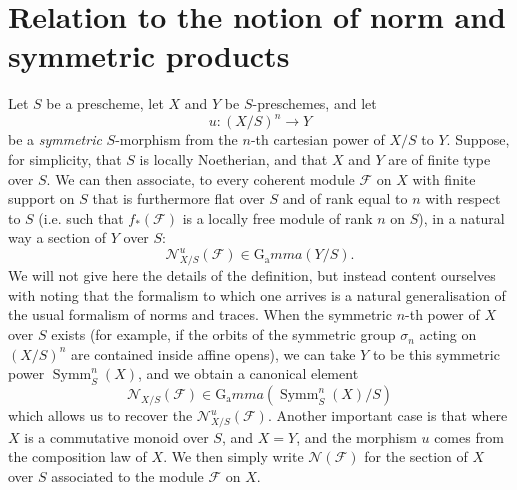 \section{Relation to the notion of norm and symmetric products}\label{fga3.iv-6}


  Let $S$ be a prescheme, let $X$ and $Y$ be $S$-preschemes, and let
  \[
    u\colon(X/S)^n\to Y
  \]
  be a \emph{symmetric} $S$-morphism from the $n$-th cartesian power of $X/S$ to $Y$.
  Suppose, for simplicity, that $S$ is locally Noetherian, and that $X$ and $Y$ are of finite type over $S$.
  We can then associate, to every coherent module $\mathcal{F}$ on $X$ with finite support on $S$ that is furthermore flat over $S$ and of rank equal to $n$ with respect to $S$ (i.e. such that $f_*(\mathcal{F})$ is a locally free module of rank $n$ on $S$), in a natural way a section of $Y$ over $S$:
  \[
    \mathcal{N}_{X/S}^u(\mathcal{F}) \in \operatorname{G_a}mma(Y/S).
  \]
  We will not give here the details of the definition, but instead content ourselves with noting that the formalism to which one arrives is a natural generalisation of the usual formalism of norms and traces.
  When the symmetric $n$-th power of $X$ over $S$ exists (for example, if the orbits of the symmetric group $\sigma_n$ acting on $(X/S)^n$ are contained inside affine opens), we can take $Y$ to be this symmetric power $\operatorname{Symm}_S^n(X)$, and we obtain a canonical element
  \[
    \mathcal{N}_{X/S}(\mathcal{F}) \in \operatorname{G_a}mma(\operatorname{Symm}_S^n(X)/S)
  \]
  which allows us to recover the $\mathcal{N}_{X/S}^u(\mathcal{F})$.
  Another important case is that where $X$ is a commutative monoid over $S$, and $X=Y$, and the morphism $u$ comes from the composition law of $X$.
  We then simply write $\mathcal{N}(\mathcal{F})$ for the section of $X$ over $S$ associated to the module $\mathcal{F}$ on $X$.



